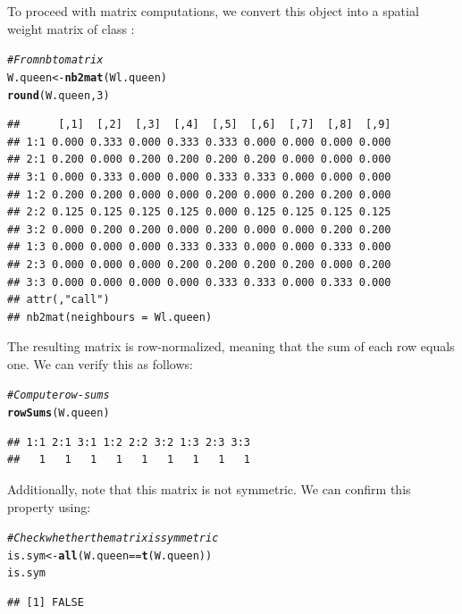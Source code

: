 \documentclass[english,12pt]{book}\usepackage[]{graphicx}\usepackage[]{xcolor}
\makeatletter
\newcommand{\hlnum}[1]{\textcolor[rgb]{0.686,0.059,0.569}{#1}}%
\newcommand{\hlcom}[1]{\textcolor[rgb]{0.678,0.584,0.686}{\textit{#1}}}%
\newcommand{\hlopt}[1]{\textcolor[rgb]{0,0,0}{#1}}%
\newcommand{\hlstd}[1]{\textcolor[rgb]{0.345,0.345,0.345}{#1}}%
\newcommand{\hlkwb}[1]{\textcolor[rgb]{0.69,0.353,0.396}{#1}}%
\newcommand{\hlkwd}[1]{\textcolor[rgb]{0.737,0.353,0.396}{\textbf{#1}}}%
\newenvironment{kframe}{%
 \def\at@end@of@kframe{}%
 \ifinner\ifhmode%
  \def\at@end@of@kframe{\end{minipage}}%
  \begin{minipage}{\columnwidth}%
 \fi\fi%
 \def\FrameCommand##1{\hskip\@totalleftmargin \hskip-\fboxsep
 \colorbox{shadecolor}{##1}\hskip-\fboxsep
     \hskip-\linewidth \hskip-\@totalleftmargin \hskip\columnwidth}%
 \MakeFramed {\advance\hsize-\width
   \@totalleftmargin\z@ \linewidth\hsize
   \@setminipage}}%
 {\par\unskip\endMakeFramed%
 \at@end@of@kframe}
\newenvironment{knitrout}{}{} %
\makeatother
\begin{document}
To proceed with matrix computations, we convert this  object into a spatial weight matrix of class :
\begin{knitrout}
\color{fgcolor}\begin{kframe}
\begin{alltt}
\hlcom{# From nb to matrix}
\hlstd{W.queen} \hlkwb{<-} \hlkwd{nb2mat}\hlstd{(Wl.queen)}
\hlkwd{round}\hlstd{(W.queen,} \hlnum{3}\hlstd{)}
\end{alltt}
\begin{verbatim}
##      [,1]  [,2]  [,3]  [,4]  [,5]  [,6]  [,7]  [,8]  [,9]
## 1:1 0.000 0.333 0.000 0.333 0.333 0.000 0.000 0.000 0.000
## 2:1 0.200 0.000 0.200 0.200 0.200 0.200 0.000 0.000 0.000
## 3:1 0.000 0.333 0.000 0.000 0.333 0.333 0.000 0.000 0.000
## 1:2 0.200 0.200 0.000 0.000 0.200 0.000 0.200 0.200 0.000
## 2:2 0.125 0.125 0.125 0.125 0.000 0.125 0.125 0.125 0.125
## 3:2 0.000 0.200 0.200 0.000 0.200 0.000 0.000 0.200 0.200
## 1:3 0.000 0.000 0.000 0.333 0.333 0.000 0.000 0.333 0.000
## 2:3 0.000 0.000 0.000 0.200 0.200 0.200 0.200 0.000 0.200
## 3:3 0.000 0.000 0.000 0.000 0.333 0.333 0.000 0.333 0.000
## attr(,"call")
## nb2mat(neighbours = Wl.queen)
\end{verbatim}
\end{kframe}
\end{knitrout}

The resulting matrix is row-normalized, meaning that the sum of each row equals one. We can verify this as follows:
\begin{knitrout}
\color{fgcolor}\begin{kframe}
\begin{alltt}
\hlcom{# Compute row-sums}
\hlkwd{rowSums}\hlstd{(W.queen)}
\end{alltt}
\begin{verbatim}
## 1:1 2:1 3:1 1:2 2:2 3:2 1:3 2:3 3:3 
##   1   1   1   1   1   1   1   1   1
\end{verbatim}
\end{kframe}
\end{knitrout}

Additionally, note that this matrix is not symmetric. We can confirm this property using:
\begin{knitrout}
\color{fgcolor}\begin{kframe}
\begin{alltt}
\hlcom{# Check whether the matrix is symmetric}
\hlstd{is.sym} \hlkwb{<-} \hlkwd{all}\hlstd{(W.queen} \hlopt{==} \hlkwd{t}\hlstd{(W.queen))}
\hlstd{is.sym}
\end{alltt}
\begin{verbatim}
## [1] FALSE
\end{verbatim}
\end{kframe}
\end{knitrout}
\end{document}
